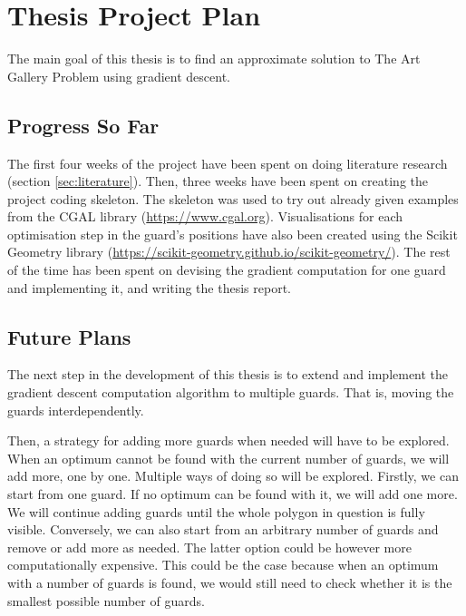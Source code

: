 \section{Thesis Project Plan}
\label{sec:thesis}
The main goal of this thesis is to find an approximate solution to The Art Gallery Problem \cite{o1987art} using gradient descent.

\subsection{Progress So Far}
The first four weeks of the project have been spent on doing literature research (section \ref{sec:literature}). Then, three weeks have been spent on creating the project coding skeleton. The skeleton was used to try out already given examples from the CGAL library (\url{https://www.cgal.org}). Visualisations for each optimisation step in the guard's positions have also been created using the Scikit Geometry library (\url{https://scikit-geometry.github.io/scikit-geometry/}). The rest of the time has been spent on devising the gradient computation for one guard and implementing it, and writing the thesis report.

\subsection{Future Plans}
The next step in the development of this thesis is to extend and implement the gradient descent computation algorithm to multiple guards. That is, moving the guards interdependently. 

Then, a strategy for adding more guards when needed will have to be explored. When an optimum cannot be found with the current number of guards, we will add more, one by one. Multiple ways of doing so will be explored. Firstly, we can start from one guard. If no optimum can be found with it, we will add one more. We will continue adding guards until the whole polygon in question is fully visible. Conversely, we can also start from an arbitrary number of guards and remove or add more as needed. The latter option could be however more computationally expensive. This could be the case because when an optimum with a number of guards is found, we would still need to check whether it is the smallest possible number of guards.

